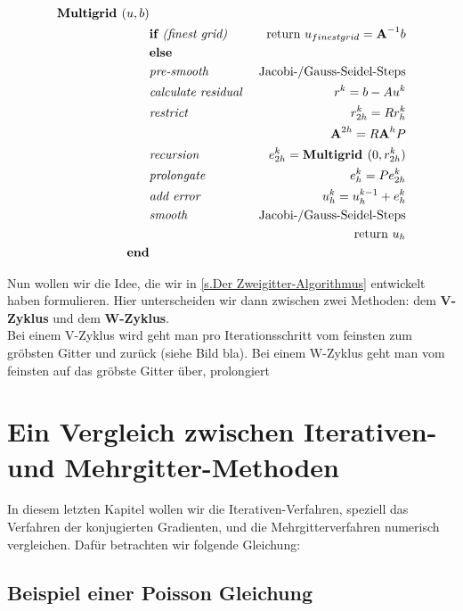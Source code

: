 \begin{eqnarray}
\textbf{Multigrid }(u,b) 			& \notag \\
&\textbf{if }\textit{(finest grid) }&\textnormal{return } u_{finest grid}={\textbf{A}}^{-1}b \notag \\
&\textbf{else }						& \notag \\
&\textit{pre-smooth } 				&\textnormal{Jacobi-/Gauss-Seidel-Steps} \notag \\
&\textit{calculate residual }		&r^{k} = b - Au^{k} \notag \\
&\textit{restrict } 				&r^{k}_{2h}=Rr^{k}_{h} \notag \\
&									&{\textbf{A}}^{2h} = R{\textbf{A}}^{h}P \notag \\
&\textit{recursion }				&e^{k}_{2h} = \textbf{Multigrid }(0,r^{k}_{2h}) \notag \\
&\textit{prolongate }				&e^{k}_{h} = Pe^{k}_{2h} \notag \\
&\textit{add error }				&u^{k}_{h} = u^{k-1}_{h} + e^{k}_{h} \notag \\
&\textit{smooth }					&\textnormal{Jacobi-/Gauss-Seidel-Steps} \notag \\
&									&\textnormal{return } u_{h} \notag \\
\textbf{end}						& \notag
\end{eqnarray}

Nun wollen wir die Idee, die wir in \autoref{s.Der Zweigitter-Algorithmus} entwickelt haben formulieren. Hier unterscheiden wir dann zwischen zwei Methoden: dem \textbf{V-Zyklus} und dem \textbf{W-Zyklus}. \\
Bei einem V-Zyklus wird geht man pro Iterationsschritt vom feinsten zum gröbsten Gitter und zurück (siehe Bild bla). Bei einem W-Zyklus geht man vom feinsten auf das gröbste Gitter über, prolongiert 

\chapter{Ein Vergleich zwischen Iterativen- und Mehrgitter-Methoden}\label{c.Vergleich}

In diesem letzten Kapitel wollen wir die Iterativen-Verfahren, speziell das Verfahren der konjugierten Gradienten, und die Mehrgitterverfahren numerisch vergleichen. Dafür betrachten wir folgende Gleichung:

\section{Beispiel einer Poisson Gleichung}\label{s.Beispiel einer Poisson Gleichung}

